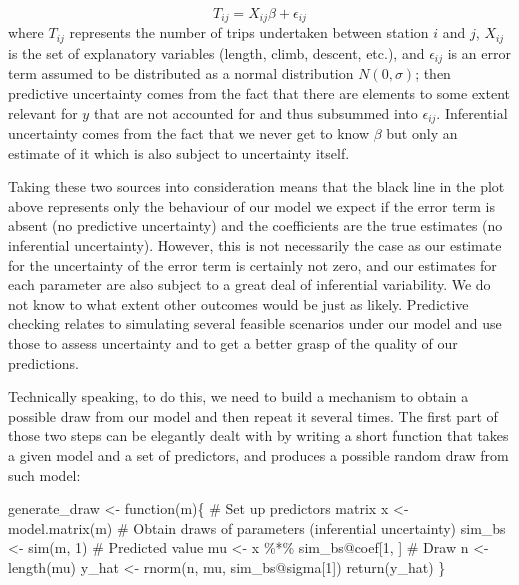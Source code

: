 \documentclass[
  letterpaper,
  krantz2]{style/krantz}
\newenvironment{Shaded}{\begin{snugshade}}{\end{snugshade}}
\newcommand{\CommentTok}[1]{\textcolor[rgb]{0.37,0.37,0.37}{#1}}
\newcommand{\ControlFlowTok}[1]{\textcolor[rgb]{0.00,0.23,0.31}{#1}}
\newcommand{\DecValTok}[1]{\textcolor[rgb]{0.68,0.00,0.00}{#1}}
\newcommand{\FunctionTok}[1]{\textcolor[rgb]{0.28,0.35,0.67}{#1}}
\newcommand{\NormalTok}[1]{\textcolor[rgb]{0.00,0.23,0.31}{#1}}
\newcommand{\OtherTok}[1]{\textcolor[rgb]{0.00,0.23,0.31}{#1}}
\newcommand{\SpecialCharTok}[1]{\textcolor[rgb]{0.37,0.37,0.37}{#1}}
\begin{document}
\[
T_{ij} = X_{ij}\beta + \epsilon_{ij}
\] where \(T_{ij}\) represents the number of trips undertaken between
station \(i\) and \(j\), \(X_{ij}\) is the set of explanatory variables
(length, climb, descent, etc.), and \(\epsilon_{ij}\) is an error term
assumed to be distributed as a normal distribution \(N(0, \sigma)\);
then predictive uncertainty comes from the fact that there are elements
to some extent relevant for \(y\) that are not accounted for and thus
subsummed into \(\epsilon_{ij}\). Inferential uncertainty comes from the
fact that we never get to know \(\beta\) but only an estimate of it
which is also subject to uncertainty itself.

Taking these two sources into consideration means that the black line in
the plot above represents only the behaviour of our model we expect if
the error term is absent (no predictive uncertainty) and the
coefficients are the true estimates (no inferential uncertainty).
However, this is not necessarily the case as our estimate for the
uncertainty of the error term is certainly not zero, and our estimates
for each parameter are also subject to a great deal of inferential
variability. We do not know to what extent other outcomes would be just
as likely. Predictive checking relates to simulating several feasible
scenarios under our model and use those to assess uncertainty and to get
a better grasp of the quality of our predictions.

Technically speaking, to do this, we need to build a mechanism to obtain
a possible draw from our model and then repeat it several times. The
first part of those two steps can be elegantly dealt with by writing a
short function that takes a given model and a set of predictors, and
produces a possible random draw from such model:

\begin{Shaded}
\begin{Highlighting}[]
\NormalTok{generate\_draw }\OtherTok{\textless{}{-}} \ControlFlowTok{function}\NormalTok{(m)\{}
  \CommentTok{\# Set up predictors matrix}
\NormalTok{  x }\OtherTok{\textless{}{-}} \FunctionTok{model.matrix}\NormalTok{(m)}
  \CommentTok{\# Obtain draws of parameters (inferential uncertainty)}
\NormalTok{  sim\_bs }\OtherTok{\textless{}{-}} \FunctionTok{sim}\NormalTok{(m, }\DecValTok{1}\NormalTok{)}
  \CommentTok{\# Predicted value}
\NormalTok{  mu }\OtherTok{\textless{}{-}}\NormalTok{ x }\SpecialCharTok{\%*\%}\NormalTok{ sim\_bs}\SpecialCharTok{@}\NormalTok{coef[}\DecValTok{1}\NormalTok{, ]}
  \CommentTok{\# Draw}
\NormalTok{  n }\OtherTok{\textless{}{-}} \FunctionTok{length}\NormalTok{(mu)}
\NormalTok{  y\_hat }\OtherTok{\textless{}{-}} \FunctionTok{rnorm}\NormalTok{(n, mu, sim\_bs}\SpecialCharTok{@}\NormalTok{sigma[}\DecValTok{1}\NormalTok{])}
  \FunctionTok{return}\NormalTok{(y\_hat)}
\NormalTok{\}}
\end{Highlighting}
\end{Shaded}
\end{document}
